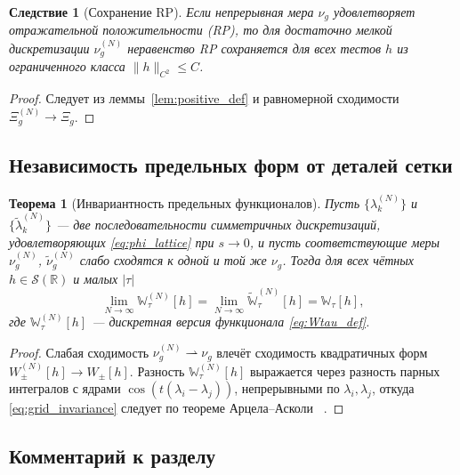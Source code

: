 \documentclass{article}
\numberwithin{equation}{section}
\theoremstyle{plain}
\newtheorem{theorem}{Теорема}
\newtheorem{corollary}{Следствие}
\theoremstyle{definition}
\theoremstyle{remark}
\def\infty{∞}\def\partial{∂}\def\sum{Σ}\def\int{∫}%
\begin{document}
\begin{corollary}[Сохранение RP]
\label{cor:RP_preservation}
Если непрерывная мера $\nu_g$ удовлетворяет отражательной положительности (RP),
то для достаточно мелкой дискретизации $\nu_g^{(N)}$ неравенство RP сохраняется
для всех тестов $h$ из ограниченного класса $\|h\|_{C^2}\le C$.
\end{corollary}

\begin{proof}
Следует из леммы~\ref{lem:positive_def} и равномерной сходимости $\Xi_g^{(N)}\to\Xi_g$.
\end{proof}

\subsection{Независимость предельных форм от деталей сетки}
\label{subsec:grid_independence}

\begin{theorem}[Инвариантность предельных функционалов]
\label{thm:grid_independence}
Пусть $\{\lambda_k^{(N)}\}$ и $\{\tilde\lambda_k^{(N)}\}$ — две последовательности
симметричных дискретизаций, удовлетворяющих \eqref{eq:phi_lattice} при $s\to0$,
и пусть соответствующие меры $\nu_g^{(N)}$, $\tilde\nu_g^{(N)}$ слабо сходятся к одной и той же
$\nu_g$. Тогда для всех чётных $h\in\mathcal S(\mathbb R)$ и малых $|\tau|$
\begin{equation}
\label{eq:grid_invariance}
\lim_{N\to\infty} \mathbb W_\tau^{(N)}[h]
=\lim_{N\to\infty} \widetilde{\mathbb W}_\tau^{(N)}[h]
=\mathbb W_\tau[h],
\end{equation}
где $\mathbb W_\tau^{(N)}[h]$ --- дискретная версия функционала \eqref{eq:Wtau_def}.
\end{theorem}

\begin{proof}
Слабая сходимость $\nu_g^{(N)}\rightharpoonup\nu_g$ влечёт сходимость квадратичных форм
$W_\pm^{(N)}[h]\to W_\pm[h]$. Разность $\mathbb W_\tau^{(N)}[h]$
выражается через разность парных интегралов с ядрами $\cos(t(\lambda_i-\lambda_j))$,
непрерывными по $\lambda_i,\lambda_j$, откуда \eqref{eq:grid_invariance} следует
по теореме Арцела–Асколи ~\cite{Krylov1959}.
\end{proof}

\subsection{Комментарий к разделу}
\label{subsec:summary10}
\end{document}
